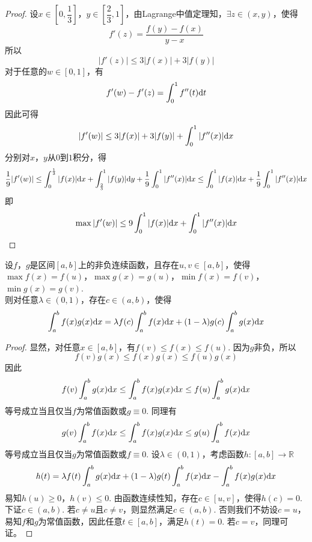 \begin{proof}

    设$x \in \left[ 0, \dfrac{1}{3} \right]$，$y \in \left[ \dfrac{2}{3}, 1 \right]$，由\textup{Lagrange}中值定理知，$\exists z \in (x, y)$，使得
    \[f'(z) = \dfrac{f(y) - f(x)}{y - x}\]
    所以
    \[|f'(z)| \leq 3|f(x)| + 3|f(y)|\]
    对于任意的$w \in [0, 1]$，有
    \[f'(w) - f'(z) = \int_{0}^{1}{f''(t)}\mathrm{d} t\]
    因此可得
    \[|f'(w)| \leq 3|f(x)| + 3|f(y)| + \int_{0}^{1}{|f''(x)|}\mathrm{d} x\]
    分别对$x$，$y$从$0$到$1$积分，得
    \[\dfrac{1}{9} |f'(w)| \leq \int_{0}^{\frac{1}{3}}{|f(x)|}\mathrm{d} x + \int_{\frac{2}{3}}^{1}{|f(y)|}\mathrm{d} y + \dfrac{1}{9} \int_{0}^{1}{|f''(x)|}\mathrm{d} x \leq \int_{0}^{1}{|f(x)|}\mathrm{d} x + \dfrac{1}{9}\int_{0}^{1}{|f''(x)|}\mathrm{d} x\]
    即
    \[\max{|f'(w)|} \leq 9\int_{0}^{1}{|f(x)|}\mathrm{d} x + \int_{0}^{1}{|f''(x)|}\mathrm{d} x\]
    
\end{proof}

\begin{theorem}
    
    设$f$，$g$是区间$[a, b]$上的非负连续函数，且存在$u, v \in [a, b]$，使得$\max{f(x)} = f(u)$，$\max{g(x)} = g(u)$，$\min{f(x)} = f(v)$，$\min{g(x)} = g(v)$. \\
    则对任意$\lambda \in (0, 1)$，存在$c \in (a, b)$，使得
    \[\int_{a}^{b}{f(x)g(x)}\mathrm{d} x = \lambda f(c) \int_{a}^{b}{f(x)}\mathrm{d} x + (1 - \lambda)g(c)\int_{a}^{b}{g(x)}\mathrm{d} x\]

\end{theorem}

\begin{proof}

    显然，对任意$x \in [a, b]$，有$f(v) \leq f(x) \leq f(u)$. 因为$g$非负，所以
    \[f(v)g(x) \leq f(x)g(x) \leq f(u)g(x)\]
    因此
    \[f(v) \int_{a}^{b}{g(x)}\mathrm{d} x \leq \int_{a}^{b}{f(x)g(x)}\mathrm{d} x \leq f(u) \int_{a}^{b}{g(x)}\mathrm{d} x\]
    等号成立当且仅当$f$为常值函数或$g \equiv 0$. 同理有
    \[g(v) \int_{a}^{b}{f(x)}\mathrm{d} x \leq \int_{a}^{b}{f(x)g(x)}\mathrm{d} x \leq g(u) \int_{a}^{b}{f(x)}\mathrm{d} x\]
    等号成立当且仅当$g$为常值函数或$f \equiv 0$. 设$\lambda \in (0, 1)$，考虑函数$h : [a, b] \to \mathbb{R}$
    \[h(t) = \lambda f(t) \int_{a}^{b}{g(x)}\mathrm{d} x + (1 - \lambda)g(t)\int_{a}^{b}{f(x)}\mathrm{d} x - \int_{a}^{b}{f(x)g(x)}\mathrm{d} x\]
    易知$h(u) \geq 0$，$h(v) \leq 0$. 由函数连续性知，存在$c \in [u, v]$，使得$h(c) = 0$. \\
    下证$c \in (a, b)$. 若$c \neq u$且$c \neq v$，则显然满足$c \in (a, b)$. 
    否则我们不妨设$c = u$，易知$f$和$g$为常值函数，因此任意$t \in [a, b]$，满足$h(t) = 0$. 若$c = v$，同理可证。

\end{proof} 


